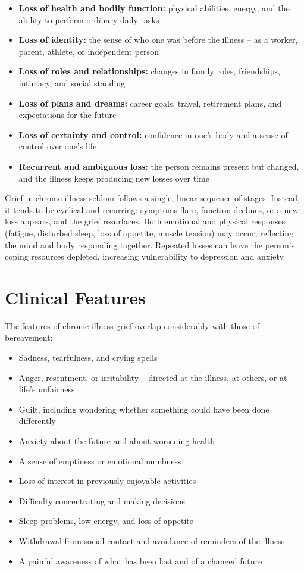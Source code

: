 \begin{itemize}
    \item \textbf{Loss of health and bodily function:} physical abilities, energy, and the ability to perform ordinary daily tasks
    \item \textbf{Loss of identity:} the sense of who one was before the illness -- as a worker, parent, athlete, or independent person
    \item \textbf{Loss of roles and relationships:} changes in family roles, friendships, intimacy, and social standing
    \item \textbf{Loss of plans and dreams:} career goals, travel, retirement plans, and expectations for the future
    \item \textbf{Loss of certainty and control:} confidence in one's body and a sense of control over one's life
    \item \textbf{Recurrent and ambiguous loss:} the person remains present but changed, and the illness keeps producing new losses over time
\end{itemize}

Grief in chronic illness seldom follows a single, linear sequence of stages. Instead, it tends to be cyclical and recurring: symptoms flare, function declines, or a new loss appears, and the grief resurfaces. Both emotional and physical responses (fatigue, disturbed sleep, loss of appetite, muscle tension) may occur, reflecting the mind and body responding together. Repeated losses can leave the person's coping resources depleted, increasing vulnerability to depression and anxiety.

\section*{Clinical Features}
The features of chronic illness grief overlap considerably with those of bereavement:

\begin{itemize}
    \item Sadness, tearfulness, and crying spells
    \item Anger, resentment, or irritability -- directed at the illness, at others, or at life's unfairness
    \item Guilt, including wondering whether something could have been done differently
    \item Anxiety about the future and about worsening health
    \item A sense of emptiness or emotional numbness
    \item Loss of interest in previously enjoyable activities
    \item Difficulty concentrating and making decisions
    \item Sleep problems, low energy, and loss of appetite
    \item Withdrawal from social contact and avoidance of reminders of the illness
    \item A painful awareness of what has been lost and of a changed future
\end{itemize}

